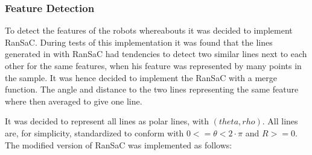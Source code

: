 \subsubsection{Feature Detection}
To detect the features of the robots whereabouts it was decided to implement RanSaC.
During tests of this implementation it was found that the lines generated in with RanSaC
had tendencies to detect two similar lines next to each other for the same features,
when his feature was represented by many points in the sample.
It was hence decided to implement the RanSaC with a merge function.
The angle and distance to the two lines representing the same feature where then averaged to give one line.



It was decided to represent all lines as polar lines, with $ (theta, rho) $.
All lines are, for simplicity, standardized to conform with $ 0 <= \theta < 2\cdot{\pi} $ and $ R >= 0 $.
The modified version of RanSaC was implemented as follows:

